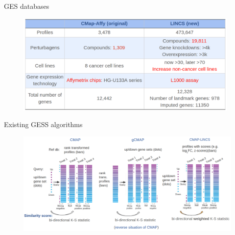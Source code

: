 \documentclass[10pt]{beamer}
\begin{document}
\begin{frame}{GES databases}
\vspace{-0.2cm}
\begin{figure}
    \includegraphics[width=11cm]{demo/images/ges_db.png}
\end{figure}
\end{frame}
\begin{frame}{Existing GESS algorithms}
  \begin{figure}
      \includegraphics[width=12cm]{demo/images/gess_algo.png}
  \end{figure}
  \centering
  \scriptsize{\textcolor{gray}{\cite{Lamb2006-du, Pacini2013-or, Subramanian2017-fu}}}
\end{frame}
\end{document}
